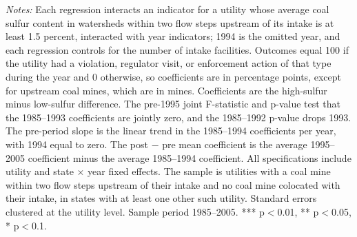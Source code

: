 \begin{table}[htbp]
\begin{minipage}{\linewidth}
\vspace{4pt}
\footnotesize
\raggedright
\textit{Notes:} Each regression interacts an indicator for a utility whose average coal sulfur content in watersheds within two flow steps upstream of its intake is at least 1.5 percent, interacted with year indicators; 1994 is the omitted year, and each regression controls for the number of intake facilities. Outcomes equal 100 if the utility had a violation, regulator visit, or enforcement action of that type during the year and 0 otherwise, so coefficients are in percentage points, except for upstream coal mines, which are in mines. Coefficients are the high-sulfur minus low-sulfur difference. The pre-1995 joint F-statistic and p-value test that the 1985--1993 coefficients are jointly zero, and the 1985--1992 p-value drops 1993. The pre-period slope is the linear trend in the 1985--1994 coefficients per year, with 1994 equal to zero. The post $-$ pre mean coefficient is the average 1995--2005 coefficient minus the average 1985--1994 coefficient. All specifications include utility and state $\times$ year fixed effects. The sample is utilities with a coal mine within two flow steps upstream of their intake and no coal mine colocated with their intake, in states with at least one other such utility. Standard errors clustered at the utility level. Sample period 1985--2005. *** p$<$0.01, ** p$<$0.05, * p$<$0.1.
\end{minipage}
\end{table}
